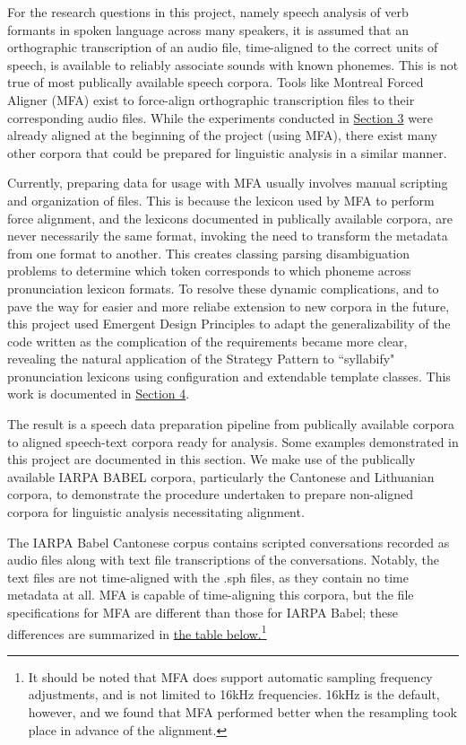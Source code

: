 \documentclass[11pt]{article}
\begin{document}
For the research questions in this project, namely speech analysis of verb formants in spoken language across many speakers, it is assumed that an orthographic transcription of an audio file, time-aligned to the correct units of speech, is available to reliably associate sounds with known phonemes. This is not true of most publically available speech corpora. Tools like Montreal Forced Aligner (MFA)\cite{mcauliffe_montreal_nodate} exist to force-align orthographic transcription files to their corresponding audio files. While the experiments conducted in \hyperlink{section.3}{Section 3} were already aligned at the beginning of the project (using MFA), there exist many other corpora that could be prepared for linguistic analysis in a similar manner. 

Currently, preparing data for usage with MFA usually involves manual scripting and organization of files. This is because the lexicon used by MFA to perform force alignment, and the lexicons documented in publically available corpora, are never necessarily the same format, invoking the need to transform the metadata from one format to another. This creates classing parsing disambiguation problems to determine which token corresponds to which phoneme across pronunciation lexicon formats. To resolve these dynamic complications, and to pave the way for easier and more reliabe extension to new corpora in the future, this project used Emergent Design Principles\cite{bain_emergent_2008} to adapt the generalizability of the code written as the complication of the requirements became more clear, revealing the natural application of the Strategy Pattern\cite{freeman_head_2004} to ``syllabify" pronunciation lexicons using configuration and extendable template classes. This work is documented in \hyperlink{section.4}{Section 4}.

The result is a speech data preparation pipeline from publically available corpora to aligned speech-text corpora ready for analysis. Some examples demonstrated in this project are documented in this section. We make use of the publically available IARPA BABEL corpora, particularly the Cantonese\cite{andrus_iarpa_2016} and Lithuanian\cite{benowitz_iarpa_2019} corpora, to demonstrate the procedure undertaken to prepare non-aligned corpora for linguistic analysis necessitating alignment.

The IARPA Babel Cantonese corpus contains scripted conversations recorded as audio files along with text file transcriptions of the conversations. Notably, the text files are not time-aligned with the .sph files, as they contain no time metadata at all. MFA is capable of time-aligning this corpora, but the file specifications for MFA are different than those for IARPA Babel; these differences are summarized in \hyperlink{table:corpus_format}{the table below.}\footnote{It should be noted that MFA does support automatic sampling frequency adjustments, and is not limited to 16kHz frequencies. 16kHz is the default, however, and we found that MFA performed better when the resampling took place in advance of the alignment.} 
\end{document}
